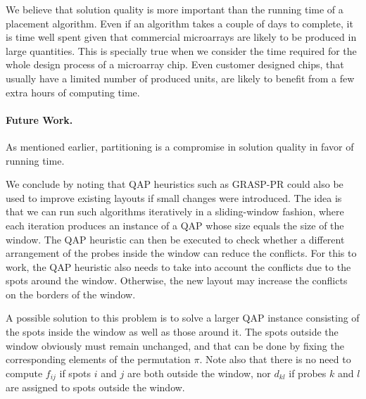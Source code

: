 \documentclass[english]{lni}
\newcommand{\ignore}[1]{}
\begin{document}
We believe that solution quality is more important than the running time of a
placement algorithm. Even if an algorithm takes a couple of days to complete,
it is time well spent given that commercial microarrays are likely to be
produced in large quantities. This is specially true when we consider the time
required for the whole design process of a microarray chip. Even customer
designed chips, that usually have a limited number of produced units, are likely
to benefit from a few extra hours of computing time.

\paragraph{Future Work.}
As mentioned earlier, partitioning is a compromise in solution quality in favor
of running time.

\ignore{
However, it is not clear yet how the choice of the maximum
recursion depth in the Centroid-based Quadrisection can undermine the
effectiveness of the placement algorithms. At the moment, we are investigating
alternative partitioning strategies and evaluating their effects on the quality
of the solutions.
}

We conclude by noting that QAP heuristics such as GRASP-PR could also be used to
improve existing layouts if small changes were introduced. The idea is that we
can run such algorithms iteratively in a sliding-window fashion, where each
iteration produces an instance of a QAP whose size equals the size of the
window. The QAP heuristic can then be executed to check whether a different
arrangement of the probes inside the window can reduce the conflicts.
For this to work, the QAP heuristic also needs to take
into account the conflicts due to the spots around the window. Otherwise, the
new layout may increase the conflicts on the borders of the window.

A possible solution to this problem is to solve a larger QAP instance
consisting of the spots inside the window as well as those around it. The
spots outside the window obviously must remain unchanged, and that can be done
by fixing the corresponding elements of the permutation $\pi$. Note also that
there is no need to compute $f_{ij}$ if spots $i$ and $j$ are both outside the
window, nor $d_{kl}$ if probes $k$ and $l$ are assigned to spots outside the
window.

\ignore{
\begin{figure}
{\footnotesize \centerline{}}
\caption{Predicted running times required to design selected Affymetrix GeneChip
arrays using GRASP-PR and a partitioning algorithm with varying degrees of
partitioning (based on data shown in Table~\ref{tab:graspr_reptx}). The
dimensions of the chips are shown in parentheses. The time required for the
partitioning itself is ignored.}\label{fig:time_extrapolation}
\end{figure}
}
\end{document}
